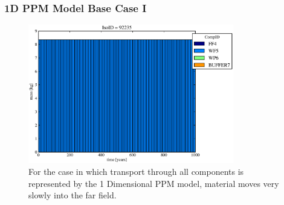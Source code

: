 
\begin{frame}
\frametitle{1D PPM Model Base Case I}
\begin{figure}[ht]
\centering
\includegraphics[width=0.8\textwidth]{./images/od.eps}
\caption[1 Dimensional PPM Model.]{
For the case in which transport through all components is represented by the 1 
Dimensional PPM model, material moves very slowly into the far field. 
}
\label{fig:odall}
\end{figure}
\end{frame}


